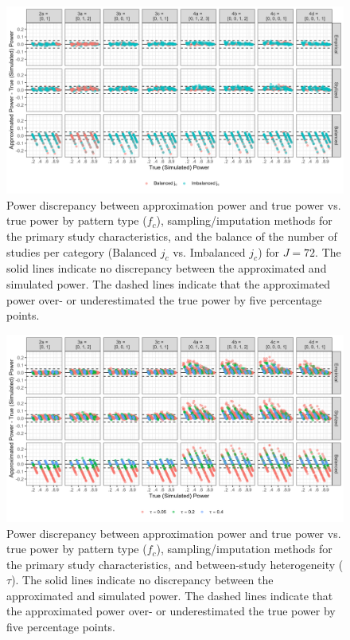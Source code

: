 \begin{figure}
    \centering
    \vspace{-5pt}\includegraphics[width=\linewidth]{chapters/plots/allsamp_bal_J72.png}\caption{Power discrepancy between approximation power and true power vs. true power by pattern type ($f_c$), sampling/imputation methods for the primary study characteristics, and the balance of the number of studies per category (Balanced $j_c$ vs. Imbalanced $j_c$) for $J = 72$. The solid lines indicate no discrepancy between the approximated and simulated power. The dashed lines indicate that the approximated power over- or underestimated the true power by five percentage points. \label{fig: allsamp_bal_J72}}
    \vspace{-5pt}
\end{figure}

\begin{figure}
    \centering
    \vspace{-5pt}\includegraphics[width=\linewidth]{chapters/plots/allsamp_tau.png}\caption{Power discrepancy between approximation power and true power vs. true power by pattern type ($f_c$), sampling/imputation methods for the primary study characteristics, and between-study heterogeneity ($\tau$). The solid lines indicate no discrepancy between the approximated and simulated power. The dashed lines indicate that the approximated power over- or underestimated the true power by five percentage points. \label{fig: allsamp_tau}}
    \vspace{-5pt}
\end{figure}

